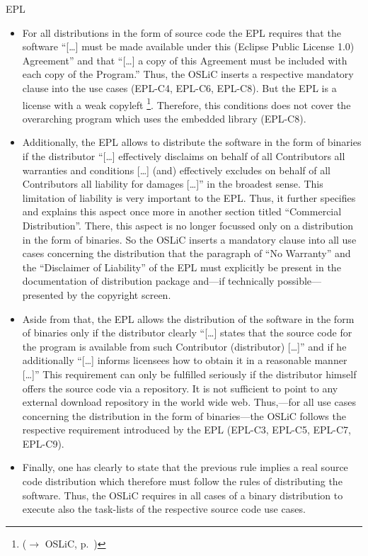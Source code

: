 \begin{license}{EPL}
\begin{itemize}
  \item For all distributions in the form of source code the EPL requires that
    the software \enquote{[\ldots] must be made available under this (Eclipse
    Public License 1.0) Agreement} and that \enquote{[\ldots] a copy of this
    Agreement must be included with each copy of the Program.} 
    Thus, the OSLiC inserts a respective mandatory clause into the use cases
    (EPL-C4, EPL-C6, EPL-C8). But the EPL is a license with a weak copyleft%
    \footnote{($\rightarrow$ OSLiC, p.\ )}. 
    Therefore, this conditions does not cover the overarching program which uses
    the embedded library (EPL-C8).
    
  \item Additionally, the EPL allows to distribute the software in the form
    of binaries if the distributor \enquote{[\ldots] effectively disclaims on
    behalf of all Contributors all warranties and conditions [\ldots] (and)
    effectively excludes on behalf of all Contributors all liability for
    damages [\ldots]} in the broadest sense. This limitation of
    liability is very important to the EPL. Thus, it further specifies and
    explains this aspect once more in another section titled \enquote{Commercial
    Distribution}. There, this aspect is no longer focussed only on a
    distribution in the form of binaries. So the OSLiC inserts a
    mandatory clause into all use cases concerning the distribution that the
    paragraph of \enquote{No Warranty} and the \enquote{Disclaimer
    of Liability} of the EPL must explicitly be present in the
    documentation of distribution package and---if technically possible---%
    presented by the copyright screen.   
  
  \item Aside from that, the EPL allows the distribution of the software in the
    form of binaries only if the distributor clearly \enquote{[\ldots] states that
    the source code for the program is available from such Contributor
    (distributor) [\ldots]} and if he additionally \enquote{[\ldots] informs
    licensees how to obtain it in a reasonable manner [\ldots]} 
    This requirement can only be fulfilled seriously if the distributor himself
    offers the source code via a repository. It is not sufficient to point to
    any external download repository in the world wide web. Thus,---for all use
    cases concerning the distribution in the form of binaries---the OSLiC
    follows the respective requirement introduced by the EPL (EPL-C3, EPL-C5,
    EPL-C7, EPL-C9).  
  
  \item Finally, one has clearly to state that the previous rule implies a real
    source code distribution which therefore must follow the rules of
    distributing the software. Thus, the OSLiC requires in all cases of a binary 
    distribution to execute also the task-lists of the respective source code
    use cases. 
 
\end{itemize}
\end{license}

%

